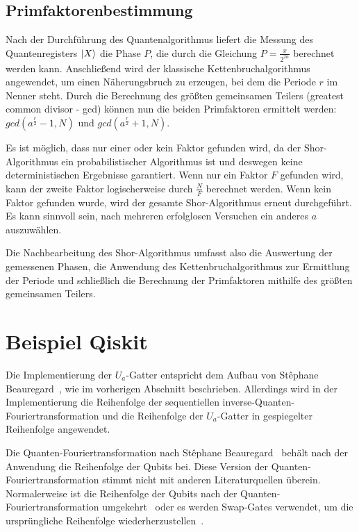 \documentclass[lettersize,journal]{IEEEtran}
\begin{document}
\subsection{Primfaktorenbestimmung}
Nach der Durchführung des Quantenalgorithmus liefert die Messung des Quantenregisters \(\ket{X}\) die Phase \(P\),
die durch die Gleichung \(P = \frac{x}{2^{2n}}\) berechnet werden kann.
Anschließend wird der klassische Kettenbruchalgorithmus angewendet,
um einen Näherungsbruch zu erzeugen, bei dem die Periode \(r\) im Nenner steht.
Durch die Berechnung des größten gemeinsamen Teilers (greatest common divisor - gcd)
können nun die beiden Primfaktoren ermittelt werden:
\(gcd(a^{\frac{r}{2}}-1, N)\) und \(gcd(a^{\frac{r}{2}}+1, N)\).

Es ist möglich, dass nur einer oder kein Faktor gefunden wird,
da der Shor-Algorithmus ein probabilistischer Algorithmus ist und
deswegen keine deterministischen Ergebnisse garantiert.
Wenn nur ein Faktor \(F\) gefunden wird,
kann der zweite Faktor logischerweise durch \(\frac{N}{F}\) berechnet werden.
Wenn kein Faktor gefunden wurde, wird der gesamte Shor-Algorithmus erneut durchgeführt.
Es kann sinnvoll sein, nach mehreren erfolglosen Versuchen ein anderes \(a\) auszuwählen.~\cite{Mounica}

Die Nachbearbeitung des Shor-Algorithmus umfasst also die Auswertung der gemessenen Phasen,
die Anwendung des Kettenbruchalgorithmus zur Ermittlung der Periode und
schließlich die Berechnung der Primfaktoren mithilfe des größten gemeinsamen Teilers.

\section{Beispiel Qiskit}
Die Implementierung der \(U_a\)-Gatter entspricht dem Aufbau von
Stêphane Beauregard~\cite{beauregard2003circuit},
wie im vorherigen Abschnitt beschrieben.
Allerdings wird in der Implementierung die Reihenfolge
der sequentiellen inverse-Quanten-Fouriertransformation und
die Reihenfolge der \(U_a\)-Gatter in gespiegelter Reihenfolge angewendet.

Die Quanten-Fouriertransformation nach
Stêphane Beauregard~\cite{beauregard2003circuit} behält
nach der Anwendung die Reihenfolge der Qubits bei.
Diese Version der Quanten-Fouriertransformation stimmt nicht
mit anderen Literaturquellen überein.
Normalerweise ist die Reihenfolge der Qubits
nach der Quanten-Fouriertransformation umgekehrt~\cite{Hoever:QC,Young:QFT} oder
es werden Swap-Gates verwendet,
um die ursprüngliche Reihenfolge wiederherzustellen~\cite{IBM:QFT}.
\end{document}
